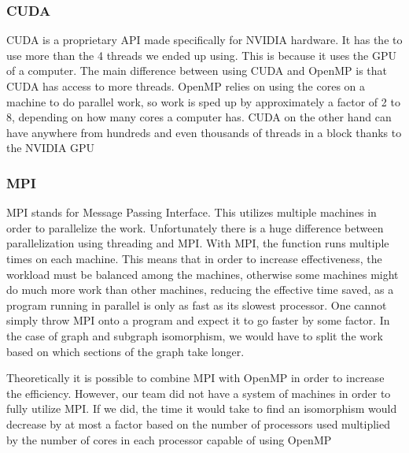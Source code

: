 \documentclass{article}
\begin{document}
    \subsubsection{CUDA}
    CUDA is a proprietary API made specifically for NVIDIA hardware. It has the to use more than the 4 threads we ended up using. This is because it uses the GPU of a computer. The main difference between using CUDA and OpenMP is that CUDA has access to more threads. OpenMP relies on using the cores on a machine to do parallel work, so work is sped up by approximately a factor of 2 to 8, depending on how many cores a computer has. CUDA on the other hand can have anywhere from hundreds and even thousands of threads in a block thanks to the NVIDIA GPU

    \subsubsection{MPI}
    MPI stands for Message Passing Interface. This utilizes multiple machines in order to parallelize the work. Unfortunately there is a huge difference between parallelization using threading and MPI. With MPI, the function runs multiple times on each machine. This means that in order to increase effectiveness, the workload must be balanced among the machines, otherwise some machines might do much more work than other machines, reducing the effective time saved, as a program running in parallel is only as fast as its slowest processor. One cannot simply throw MPI onto a program and expect it to go faster by some factor. In the case of graph and subgraph isomorphism, we would have to split the work based on which sections of the graph take longer.
   
    Theoretically it is possible to combine MPI with OpenMP in order to increase the efficiency. However, our team did not have a system of machines in order to fully utilize MPI. If we did, the time it would take to find an isomorphism would decrease by at most a factor based on the number of processors used multiplied by the number of cores in each processor capable of using OpenMP
   
\end{document}
